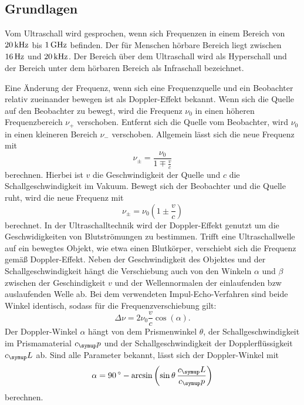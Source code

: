 \subsection{Grundlagen}
Vom Ultraschall wird gesprochen, wenn sich Frequenzen in einem Bereich von
$20\,\si{\kilo\hertz}$ bis $1\,\si{\giga\hertz}$ befinden. Der für Menschen hörbare Bereich liegt zwischen
$16\,\si{\hertz}$ und $20\,\si{\kilo\hertz}$. Der Bereich über dem Ultraschall wird als Hyperschall und
der Bereich unter dem hörbaren Bereich als Infraschall bezeichnet.

Eine Änderung der Frequenz, wenn sich eine Frequenzquelle und ein Beobachter
relativ zueinander bewegen ist als Doppler-Effekt bekannt. Wenn sich die Quelle
auf den Beobachter zu bewegt, wird die Frequenz $\nu_0$ in einen höheren
Frequenzbereich $\nu_+$ verschoben. Entfernt sich die Quelle vom Beobachter,
wird $\nu_0$ in einen kleineren Bereich $\nu_-$ verschoben. Allgemein lässt
sich die neue Frequenz mit
\begin{equation}
  \nu_\pm = \frac{\nu_0}{1\mp\frac{v}{c}}
\end{equation}
berechnen. Hierbei ist $v$ die Geschwindigkeit der Quelle und $c$ die
Schallgeschwindigkeit im Vakuum.
Bewegt sich der Beobachter und die Quelle ruht, wird die neue Frequenz mit
\begin{equation}
  \nu_\pm=\nu_0\left(1\pm\frac{v}{c}\right)
\end{equation}
berechnet. In der Ultraschalltechnik wird der Doppler-Effekt genutzt um die
Geschwidigkeiten von Blutströmungen zu bestimmen. Trifft eine Ultraschallwelle
auf ein bewegtes Objekt, wie etwa einen Blutkörper, verschiebt sich die Frequenz
gemäß Doppler-Effekt. Neben der Geschwindigkeit des Objektes und der
Schallgeschwindigkeit hängt die Verschiebung auch von den Winkeln $\alpha$ und
$\beta$ zwischen der Geschindigkeit $v$ und der Wellennormalen der einlaufenden
bzw auslaufenden Welle ab. Bei dem verwendeten Impul-Echo-Verfahren sind beide
Winkel identisch, sodass für die Frequenzverschiebung gilt:
\begin{equation}
  \Delta\nu = 2\nu_0\frac{v}{c}\cos(\alpha).
  \label{eqn:deltanu}
\end{equation}
Der Doppler-Winkel $\alpha$ hängt von dem Prismenwinkel $\theta$, der
Schallgeschwindigkeit im Prismamaterial $c_\su{p}$ und der Schallgeschwindigkeit
der Dopplerflüssigkeit $c_\su{L}$ ab. Sind alle Parameter bekannt, lässt sich
der Doppler-Winkel mit
\begin{equation}
  \alpha = 90\dgr -\arcsin\left(\sin\theta\,\frac{c_\su{L}}{c_\su{p}}\right)
  \label{eqn:alpha}
\end{equation}
berechnen.
